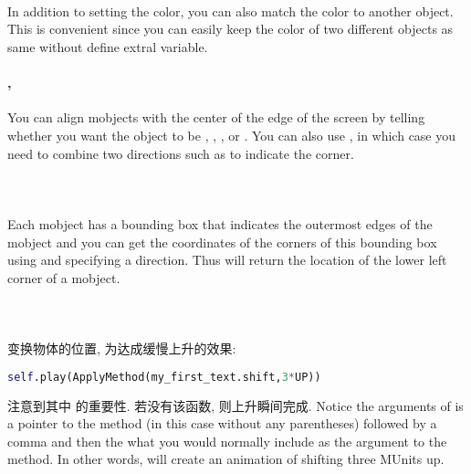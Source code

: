        \paragraph{ \\}
            \hspace*{2em}In addition to setting the color, you can also match the color to another object. This is convenient since you can easily keep the color of two different objects as same without define extral variable.

        \paragraph{,  \\}
            \hspace*{2em}You can align mobjects with the center of the edge of the screen by telling  whether you want the object to be , , , or . You can also use , in which case you need to combine two directions such as  to indicate the corner.

        \paragraph{ \\}
            \hspace*{2em}Each mobject has a bounding box that indicates the outermost edges of the mobject and you can get the coordinates of the corners of this bounding box using  and specifying a direction. Thus  will return the location of the lower left corner of a mobject.

        \paragraph{ \\}
            \hspace*{2em}变换物体的位置, 为达成缓慢上升的效果:
                \begin{lstlisting}[language = {Python}, gobble = 20]
                    self.play(ApplyMethod(my_first_text.shift,3*UP))
                \end{lstlisting}
            注意到其中  的重要性. 若没有该函数, 则上升瞬间完成. Notice the arguments of  is a pointer to the method (in this case  without any parentheses) followed by a comma and then the what you would normally include as the argument to the  method. In other words,  will create an animation of shifting  three MUnits up.


